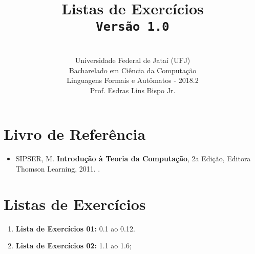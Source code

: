 \documentclass[12pt,a4paper,oneside]{article}
\author{\\Universidade Federal de Jataí (UFJ)\\Bacharelado em Ciência da Computação \\Linguagens Formais e Autômatos - 2018.2 \\Prof. Esdras Lins Bispo Jr.}
\date{}
\title{
	\sc \huge Listas de Exercícios
	\\{\tt Versão 1.0}
}
\begin{document}
\maketitle

\section{Livro de Referência}
	\begin{itemize}
		\item SIPSER, M. {\bf Introdução à Teoria da Computação}, 2a Edição, Editora Thomson Learning, 2011. \color{blue}{\bf Código Bib.: [004 SIP/int]}.
	\end{itemize}
	
\section{Listas de Exercícios}

\begin{enumerate}

	\subsection{Mini-Teste 1}
	\item[] {\bf Lista de Exercícios 01:} 0.1 ao 0.12.
	\item[] {\bf Lista de Exercícios 02:} 1.1 ao 1.6;
	
	
	
	
\end{enumerate}
\end{document}
